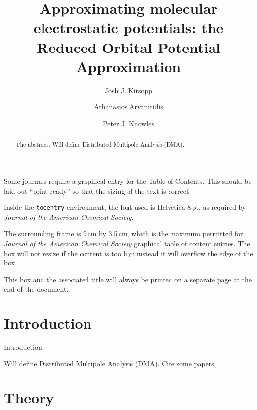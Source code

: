 \documentclass[journal=jacsat,manuscript=article]{achemso}
\author{Josh J. Kirsopp}
\author{Athanasios Arvanitidis}
\author{Peter J. Knowles}
\affiliation[Cardiff University]
{School of Chemistry, Cardiff University, Cardiff CF10 3AT, United Kingdom}
\title[Reduced Orbital Potential Approximation]
  {Approximating molecular electrostatic potentials: the Reduced Orbital Potential Approximation}
\begin{document}
\begin{tocentry}

Some journals require a graphical entry for the Table of Contents.
This should be laid out ``print ready'' so that the sizing of the
text is correct.

Inside the \texttt{tocentry} environment, the font used is Helvetica
8\,pt, as required by \emph{Journal of the American Chemical
Society}.

The surrounding frame is 9\,cm by 3.5\,cm, which is the maximum
permitted for  \emph{Journal of the American Chemical Society}
graphical table of content entries. The box will not resize if the
content is too big: instead it will overflow the edge of the box.

This box and the associated title will always be printed on a
separate page at the end of the document.

\end{tocentry}

\begin{abstract}
  The abstract.
  Will define
  Distributed Multipole Analysis (DMA).
\end{abstract}

\section{Introduction}
Introduction

  Will define
  Distributed Multipole Analysis (DMA)\cite{Stone1981,Stone1985DistributedAnalysis,Stone2005DistributedSets.}.
Cite some papers\cite{Knizia2015}

\section{Theory}
\end{document}
